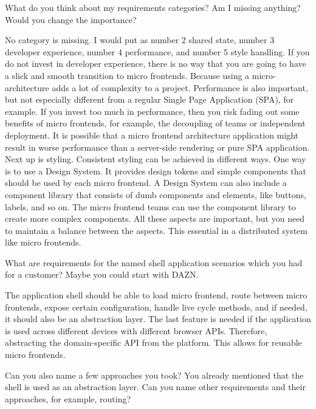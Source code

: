\begin{description}
    \NicoVogel What do you think about my requirements categories? Am I missing anything? Would you change the importance?

    \LucaMezzalira No category is missing. I would put as number 2 shared state, number 3 developer experience, number 4 performance, and number 5 style handling. If you do not invest in developer experience, there is no way that you are going to have a slick and smooth transition to micro frontends. Because using a micro-architecture adds a lot of complexity to a project. Performance is also important, but not especially different from a regular Single Page Application (SPA), for example. If you invest too much in performance, then you risk fading out some benefits of micro frontends, for example, the decoupling of teams or independent deployment. It is possible that a micro frontend architecture application might result in worse performance than a server-side rendering or pure SPA application.
    Next up is styling. Consistent styling can be achieved in different ways. One way is to use a Design System. It provides design tokens and simple components that should be used by each micro frontend. A Design System can also include a component library that consists of dumb components and elements, like buttons, labels, and so on. The micro frontend teams can use the component library to create more complex components.
    All these aspects are important, but you need to maintain a balance between the aspects. This essential in a distributed system like micro frontends.


    \NicoVogel What are requirements for the named shell application scenarios which you had for a customer? Maybe you could start with DAZN.

    \LucaMezzalira The application shell should be able to load micro frontend, route between micro frontends, expose certain configuration, handle live cycle methods, and if needed, it should also be an abstraction layer. The last feature is needed if the application is used across different devices with different browser APIs. Therefore, abstracting the domain-specific API from the platform. This allows for reusable micro frontends.

    \NicoVogel Can you also name a few approaches you took? You already mentioned that the shell is used as an abstraction layer. Can you name other requirements and their approaches, for example, routing?



\end{description}
